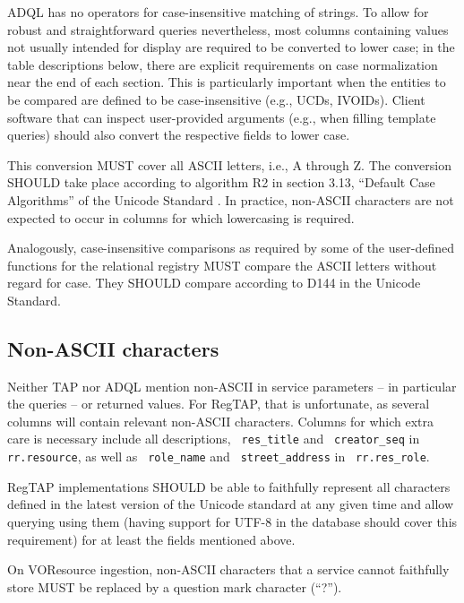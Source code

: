 \documentclass[11pt,a4paper]{ivoa}
\newcommand{\rtent}[1]{\texttt{\color{rtcolor} #1}}
\begin{document}
\label{casenorm}

ADQL has no operators for case-insensitive matching of strings.  To
allow for robust and straightforward queries nevertheless, most columns
containing values not usually intended for display are required to be
converted to lower case; in the table descriptions below, there are
explicit requirements on case normalization near the end of each
section.  This is particularly important when the entities to be
compared are defined to be case-insensitive (e.g., UCDs, IVOIDs).
Client software that can inspect user-provided arguments (e.g., when
filling template queries) should also convert the respective fields to
lower case.

This conversion MUST cover all ASCII letters, i.e., A through Z.  
The conversion SHOULD take place according to
algorithm R2 in section 3.13, ``Default Case Algorithms'' of the Unicode
Standard
\citep{std:UNICODE}.  In practice, non-ASCII characters are not expected
to occur in columns for which lowercasing is required.

Analogously, case-insensitive comparisons as required by some of the
user-defined functions for the relational registry MUST compare
the ASCII letters without regard for case.  They SHOULD compare according
to D144 in the Unicode Standard.


\subsection{Non-ASCII characters}

\label{utfreq}

Neither TAP nor ADQL mention non-ASCII in service parameters -- in
particular the queries -- or returned values.  For RegTAP, that is
unfortunate, as several columns will contain relevant non-ASCII
characters.  Columns for which extra care is necessary include all
descriptions, \rtent{res\_title} and \rtent{creator\_seq} in
\rtent{rr.resource}, as well as \rtent{role\_name} and
\rtent{street\_address} in \rtent{rr.res\_role}.

RegTAP implementations SHOULD be able to faithfully represent all
characters defined in the latest version of the Unicode standard 
\citep{std:UNICODE} at
any given time and allow querying using them (having support for UTF-8
in the database should cover this requirement) for at least the fields
mentioned above.

On VOResource ingestion, non-ASCII characters that a service cannot
faithfully store MUST be replaced by a question mark character (``?'').
\end{document}
